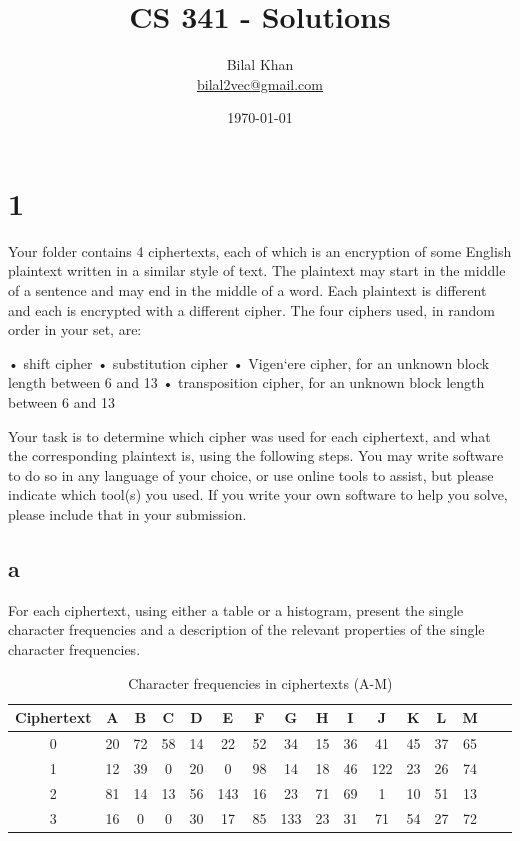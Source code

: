 \documentclass[11pt]{article}
\title{CS 341 - Solutions}
\author{Bilal Khan\\
\href{mailto:bilal2vec@gmail.com}{bilal2vec@gmail.com}}
\date{\today}
\begin{document}
\maketitle

\tableofcontents

\section{1}

Your folder contains 4 ciphertexts, each of which is an encryption of some English plaintext written in a similar style of text. The plaintext may start in the middle of a sentence and may end in the middle of a word. Each plaintext is diﬀerent and each is encrypted with a diﬀerent cipher. The four ciphers used, in random order in your set, are:

• shift cipher
• substitution cipher
• Vigen`ere cipher, for an unknown block length between 6 and 13
• transposition cipher, for an unknown block length between 6 and 13

Your task is to determine which cipher was used for each ciphertext, and what the corresponding plaintext is, using the following steps. You may write software to do so in any language of your choice, or use online tools to assist, but please indicate which tool(s) you used. If you write your own software to help you solve, please include that in your submission.

\subsection{a}

For each ciphertext, using either a table or a histogram, present the single character
frequencies and a description of the relevant properties of the single character frequencies.

\begin{table}[h]
    \centering
    \begin{tabular}{|c|c|c|c|c|c|c|c|c|c|c|c|c|c|c|c|}
    \hline
    Ciphertext & A & B & C & D & E & F & G & H & I & J & K & L & M \\
    \hline
    0 & 20 & 72 & 58 & 14 & 22 & 52 & 34 & 15 & 36 & 41 & 45 & 37 & 65 \\
    \hline
    1 & 12 & 39 & 0 & 20 & 0 & 98 & 14 & 18 & 46 & 122 & 23 & 26 & 74 \\
    \hline
    2 & 81 & 14 & 13 & 56 & 143 & 16 & 23 & 71 & 69 & 1 & 10 & 51 & 13 \\
    \hline
    3 & 16 & 0 & 0 & 30 & 17 & 85 & 133 & 23 & 31 & 71 & 54 & 27 & 72 \\
    \hline
    \end{tabular}
    \caption{Character frequencies in ciphertexts (A-M)}
    \label{tab:char_frequencies_A_M}
    \end{table}
    
\end{document}
